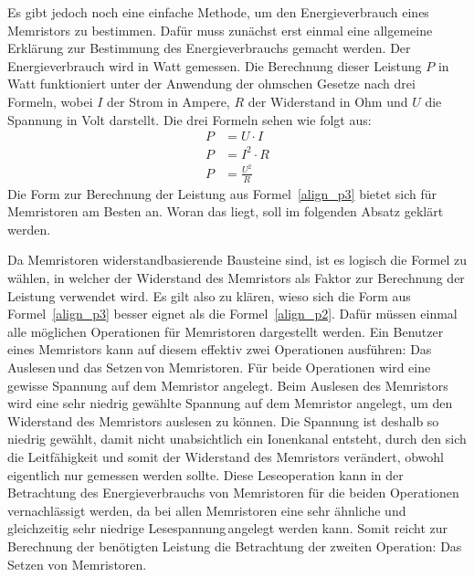   Es gibt jedoch noch eine einfache Methode, um den Energieverbrauch eines Memristors zu bestimmen. Dafür muss zunächst erst einmal eine allgemeine Erklärung zur Bestimmung des Energieverbrauchs gemacht werden. Der Energieverbrauch wird in Watt gemessen. Die Berechnung dieser Leistung $P$ in Watt funktioniert unter der Anwendung der ohmschen Gesetze nach drei Formeln, wobei $I$ der Strom in Ampere, $R$ der Widerstand in Ohm und $U$ die Spannung in Volt darstellt. Die drei Formeln sehen wie folgt aus:
  \begin{align}
    P &= U \cdot I \label{align_p1}\\
    P &= I^2 \cdot R \label{align_p2}\\
    P &= \frac{U^2}{R} \label{align_p3}
  \end{align}
  Die Form zur Berechnung der Leistung aus Formel~\ref{align_p3} bietet sich für Memristoren am Besten an. Woran das liegt, soll im folgenden Absatz geklärt werden.

  Da Memristoren widerstandbasierende Bausteine sind, ist es logisch die Formel zu wählen, in welcher der Widerstand des Memristors als Faktor zur Berechnung der Leistung verwendet wird. Es gilt also zu klären, wieso sich die Form aus Formel~\ref{align_p3} besser eignet als die Formel~\ref{align_p2}. Dafür müssen einmal alle möglichen Operationen für Memristoren dargestellt werden. Ein Benutzer eines Memristors kann auf diesem effektiv zwei Operationen ausführen: Das \glqq Auslesen\grqq\,und das \glqq Setzen\grqq\,von Memristoren. Für beide Operationen wird eine gewisse Spannung auf dem Memristor angelegt. Beim Auslesen des Memristors wird eine sehr niedrig gewählte Spannung auf dem Memristor angelegt, um den Widerstand des Memristors auslesen zu können. Die Spannung ist deshalb so niedrig gewählt, damit nicht unabsichtlich ein Ionenkanal entsteht, durch den sich die Leitfähigkeit und somit der Widerstand des Memristors verändert, obwohl eigentlich nur gemessen werden sollte. Diese Leseoperation kann in der Betrachtung des Energieverbrauchs von Memristoren für die beiden Operationen vernachlässigt werden, da bei allen Memristoren eine sehr ähnliche und gleichzeitig sehr niedrige \glqq Lesespannung\grqq\,angelegt werden kann. Somit reicht zur Berechnung der benötigten Leistung die Betrachtung der zweiten Operation: Das Setzen von Memristoren.

